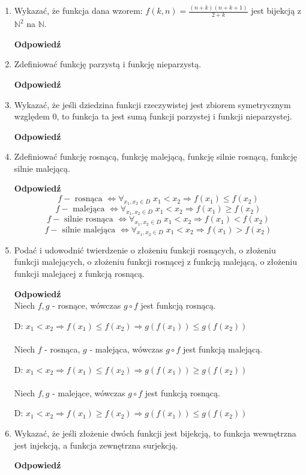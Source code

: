 \documentclass[12pt,a4paper]{article}
\newcounter{twierdzenie}
\theoremstyle{break}
\newcommand{\Odp}[1]{
		\begin{mdframed}[style=zadanie]
			\textbf{Odpowiedź}\\
			#1
		\end{mdframed}
	}
\begin{document}
\begin{enumerate}[1.]
{	}
	
	\item Wykazać, że funkcja dana wzorem: $f (k, n) = \frac{(n+k)(n+k+1)}{2 + k}$ jest bijekcją z $\mathbb{N}^2$ na $\mathbb{N}$.
	\Odp{
		
	}
	
	\item Zdeﬁniować funkcję parzystą i funkcję nieparzystą.
	\Odp{
		
	}
	
	\item Wykazać, że jeśli dziedzina funkcji rzeczywistej jest zbiorem symetrycznym względem 0, to funkcja ta jest sumą funkcji parzystej i funkcji nieparzystej.
	\Odp{
		
	}
	
	\item Zdeﬁniować funkcję rosnącą, funkcję malejącą, funkcję silnie rosnącą, funkcję silnie malejącą.
	\Odp{
		$$f-\text{ rosnąca } \Leftrightarrow \forall_{x_1,x_2\in D}\; x_1<x_2\Rightarrow f(x_1)\leq f(x_2)$$
		$$f-\text{ malejąca } \Leftrightarrow \forall_{x_1,x_2\in D}\; x_1<x_2\Rightarrow f(x_1)\geq f(x_2)$$
		$$f-\text{ silnie rosnąca } \Leftrightarrow \forall_{x_1,x_2\in D}\; x_1<x_2\Rightarrow f(x_1)< f(x_2)$$
		$$f-\text{ silnie malejąca } \Leftrightarrow \forall_{x_1,x_2\in D}\; x_1<x_2\Rightarrow f(x_1)> f(x_2)$$
		
	}
	
	\item Podać i udowodnić twierdzenie o złożeniu funkcji rosnących, o złożeniu funkcji malejących, o złożeniu funkcji rosnącej z funkcją malejącą, o złożeniu funkcji malejącej z funkcją rosnącą.
	\Odp{
		Niech $f,g$ - rosnące, wówczas $g\circ f$ jest funkcją rosnącą.
		
		D: $x_1<x_2 \Rightarrow f(x_1)\leq f(x_2) \Rightarrow g(f(x_1))\leq g(f(x_2))$\\\\
		
		Niech $f$ - rosnąca, $g$ - malejąca, wówczas $g\circ f$ jest funkcją malejącą.
		
		D: $x_1<x_2 \Rightarrow f(x_1)\leq f(x_2) \Rightarrow g(f(x_1))\geq g(f(x_2))$\\\\
		
		Niech $f,g$ - malejące, wówczas $g\circ f$ jest funkcją rosnącą.
		
		D: $x_1<x_2 \Rightarrow f(x_1)\geq f(x_2) \Rightarrow g(f(x_1))\leq g(f(x_2))$
	}
	
	\item Wykazać, że jeśli złożenie dwóch funkcji jest bijekcją, to funkcja wewnętrzna jest	injekcją, a funkcja zewnętrzna surjekcją.
	\Odp{
		
}
\end{enumerate}
\end{document}
